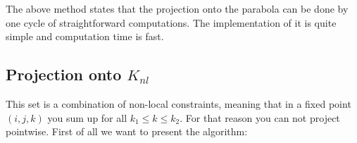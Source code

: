 
        The above method states that the projection onto the parabola can be done by one cycle of straightforward computations. The implementation of it is quite simple and computation time is fast.%

    \subsection{Projection onto $K_{nl}$}

        This set is a combination of non-local constraints, meaning that in a fixed point $(i, j, k)$ you sum up for all $k_{1} \le k \le k_{2}$. For that reason you can not project pointwise. First of all we want to present the algorithm:


